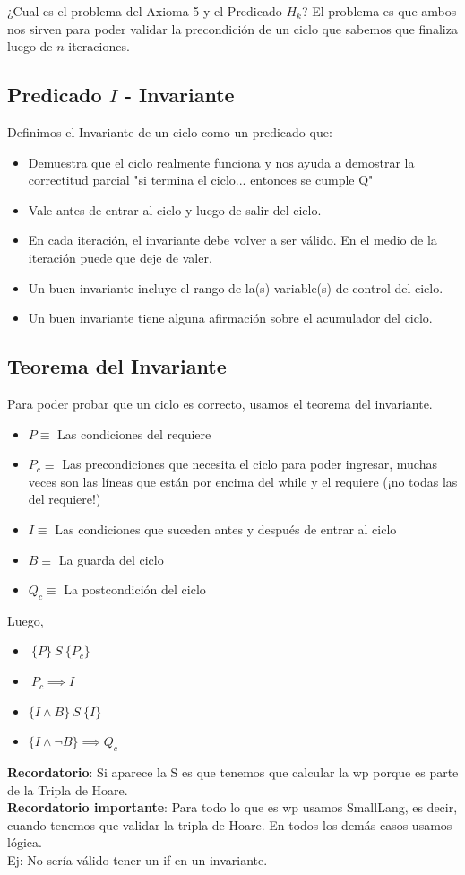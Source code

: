 \documentclass[10pt,a4paper]{article}
\begin{document}
¿Cual es el problema del Axioma 5 y el Predicado \(H_{k}\)? El problema es que ambos nos sirven para poder validar la precondición de un ciclo que sabemos que finaliza luego de \(n\) iteraciones.

\subsection*{Predicado \(I\) - Invariante}
Definimos el Invariante de un ciclo como un predicado que:
\begin{itemize}
    \item Demuestra que el ciclo realmente funciona y nos ayuda a demostrar la correctitud parcial "si termina el ciclo... entonces se cumple Q"
    \item Vale antes de entrar al ciclo y luego de salir del ciclo.
    \item En cada iteración, el invariante debe volver a ser válido. En el medio de la iteración puede que deje de valer.
    \item Un buen invariante incluye el rango de la(s) variable(s) de control del ciclo.
    \item Un buen invariante tiene alguna afirmación sobre el acumulador del ciclo.
\end{itemize} 

\subsection*{Teorema del Invariante}
Para poder probar que un ciclo es correcto, usamos el teorema del invariante.
\begin{itemize}
    \item \(P \equiv \) Las condiciones del requiere
    \item \(P_{c} \equiv\) Las precondiciones que necesita el ciclo para poder ingresar, muchas veces son las líneas que están por encima del while y el requiere (¡no todas las del requiere!)
    \item \(I \equiv \) Las condiciones que suceden antes y después de entrar al ciclo
    \item \(B \equiv \) La guarda del ciclo
    \item \(Q_{c} \equiv\) La postcondición del ciclo
  
\end{itemize} 
Luego, 
\begin{itemize}
    \item \(\ \{P\} \ S \ \{P_{c}\}\)
    \item \(\ P_{c} \implies I\)
    \item \(\{I \land B\} \ S \ \{I\}\)
    \item \(\{I \land \neg B\} \implies Q_{c}\)
\end{itemize} 
\textbf{Recordatorio}: Si aparece la S es que tenemos que calcular la wp porque es parte de la Tripla de Hoare. \\
\textbf{Recordatorio importante}: Para todo lo que es wp usamos SmallLang, es decir, cuando tenemos que validar la tripla de Hoare. En todos los demás casos usamos lógica. \\
Ej: No sería válido tener un if en un invariante.
\end{document}
